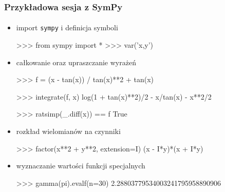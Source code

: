 \documentclass[10pt]{beamer}
\begin{document}
\begin{frame}[fragile]
    \frametitle{Przykładowa sesja z SymPy}
    \framesubtitle{}

    \begin{itemize}
        \item import \texttt{sympy} i definicja symboli
            \begin{python}
>>> from sympy import *
>>> var('x,y')
            \end{python}
        \pause
        \item całkowanie oraz upraszczanie wyrażeń
            \begin{python}
>>> f = (x - tan(x)) / tan(x)**2 + tan(x)

>>> integrate(f, x)
log(1 + tan(x)**2)/2 - x/tan(x) - x**2/2

>>> ratsimp(_.diff(x)) == f
True
            \end{python}
    \pause
        \item rozkład wielomianów na czynniki
            \begin{python}
>>> factor(x**2 + y**2, extension=I)
(x - I*y)*(x + I*y)
            \end{python}
        \pause
        \item wyznaczanie wartości funkcji specjalnych
            \begin{python}
>>> gamma(pi).evalf(n=30)
2.28803779534003241795958890906
            \end{python}
    \end{itemize}
\end{frame}
\end{document}
